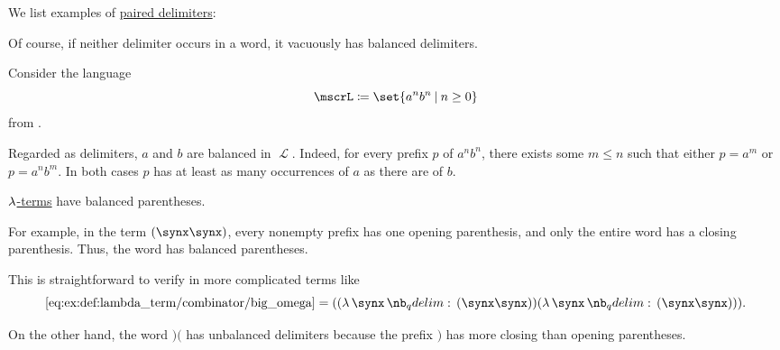 \begin{example}\label{ex:def:paired_delimiters}
  We list examples of \hyperref[def:paired_delimiters]{paired delimiters}:
  \begin{thmenum}
     Of course, if neither delimiter occurs in a word, it vacuously has balanced delimiters.

     Consider the language
    \begin{equation*}
      \mscrL \coloneqq \set{ a^n b^n \given n \geq 0 }
    \end{equation*}
    from .

    Regarded as delimiters, \( a \) and \( b \) are balanced in \( \mscrL \). Indeed, for every prefix \( p \) of \( a^n b^n \), there exists some \( m \leq n \) such that either \( p = a^m \) or \( p = a^n b^m \). In both cases \( p \) has at least as many occurrences of \( a \) as there are of \( b \).

     \hyperref[def:lambda_term]{\( \mathrm{\lambda} \)-terms} have balanced parentheses.

    For example, in the term \( (\synx \synx) \), every nonempty prefix has one opening parenthesis, and only the entire word has a closing parenthesis. Thus, the word has balanced parentheses.

    This is straightforward to verify in more complicated terms like
    \begin{equation*}
      \ref{eq:ex:def:lambda_term/combinator/big_omega} = ((\qabs \synx (\synx \synx)) (\qabs \synx (\synx \synx))).
    \end{equation*}

     On the other hand, the word \( )( \) has unbalanced delimiters because the prefix \( ) \) has more closing than opening parentheses.
  \end{thmenum}
\end{example}

